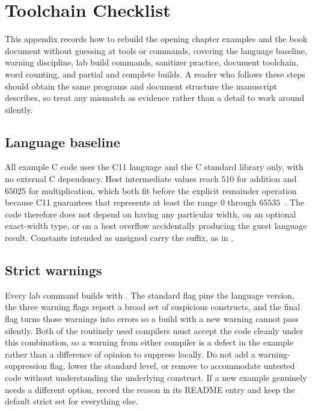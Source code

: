 \chapter{Toolchain Checklist}
\label{ch:app-b-toolchain}

This appendix records how to rebuild the opening chapter examples and the book document without guessing at tools or commands, covering the language baseline, warning discipline, lab build commands, sanitizer practice, document toolchain, word counting, and partial and complete builds.
A reader who follows these steps should obtain the same programs and document structure the manuscript describes, so treat any mismatch as evidence rather than a detail to work around silently.

\section{Language baseline}
\label{sec:app-b-baseline}

All example C code uses the C11 language and the C standard library only, with no external C dependency.
Host intermediate values reach $510$ for addition and $65025$ for multiplication, which both fit before the explicit remainder operation because C11 guarantees that  represents at least the range $0$ through $65535$~\cite[Section~5.2.4.2.1]{wg14-2011-c11}.
The code therefore does not depend on  having any particular width, on an optional exact-width type, or on a host overflow accidentally producing the guest language result.
Constants intended as unsigned carry the  suffix, as in .

\section{Strict warnings}
\label{sec:app-b-warnings}

Every lab command builds with .
The standard flag pins the language version, the three warning flags report a broad set of suspicious constructs, and the final flag turns those warnings into errors so a build with a new warning cannot pass silently.
Both of the routinely used compilers must accept the code cleanly under this combination, so a warning from either compiler is a defect in the example rather than a difference of opinion to suppress locally.
Do not add a warning-suppression flag, lower the standard level, or remove  to accommodate untested code without understanding the underlying construct.
If a new example genuinely needs a different option, record the reason in its README entry and keep the default strict set for everything else.

